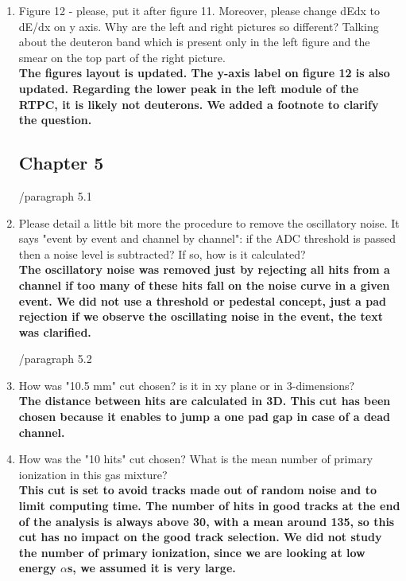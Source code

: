 \documentclass[a4paper,11pt,twoside]{article}
\begin{document}
\begin{enumerate}
\item Figure 12 - please, put it after figure 11. Moreover, please change dEdx 
   to dE/dx on y axis. Why are the left and right pictures so different?  
   Talking about the deuteron band which is present only in the left figure and 
   the smear on the top part of the right picture. \\
{ \bf The figures layout is updated. The y-axis label on figure 12 
   is also updated. Regarding the lower 
   peak in the left module of the RTPC, it is likely not deuterons. We added
   a footnote to clarify the question.} 

\subsection*{ Chapter 5}
        /paragraph 5.1	
     
\item Please detail a little bit more the procedure to remove the oscillatory 
   noise. It says "event by event and channel by channel": if the ADC threshold 
   is passed then a noise level is subtracted? If so, how is it calculated?\\
{ \bf The oscillatory noise was removed just by rejecting all hits 
from a channel if too many of these hits fall on the noise curve in a given 
event. We did not use a threshold or pedestal concept, just a pad rejection 
if we observe the oscillating noise in the event, the text was clarified.} 

/paragraph 5.2
\item How was "10.5 mm" cut chosen? is it in xy plane or in 3-dimensions?\\
{ \bf The distance between hits are calculated in 3D. This cut has 
been chosen because it enables to jump a one pad gap in case of a dead 
channel.} 

\item How was the "10 hits" cut chosen? What is the mean number of primary 
   ionization in this gas mixture?\\
   { \bf This cut is set to avoid tracks made out of random noise and
to limit computing time. The number of hits in good tracks at the end of the 
analysis is always above 30, with a mean around 135, so this cut has no impact 
on the good track selection. We did not study the number of primary ionization, 
since we are looking at low energy $\alpha$s, we assumed it is very large. }


\end{enumerate}
\end{document}
